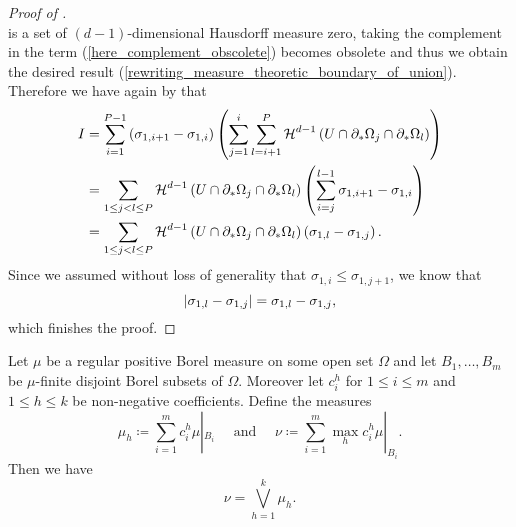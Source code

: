 \begin{proof}[Proof of ]
\begin{equation*}
	\end{equation*}
	is a set of $ (d- 1 )$-dimensional Hausdorff measure zero, taking the complement in the term (\ref{here_complement_obscolete}) becomes obsolete and thus we obtain the desired result (\ref{rewriting_measure_theoretic_boundary_of_union}).
	Therefore we have again by   that
	\begin{align*}
		I &=
		\sum_{ i = 1 }^{ P - 1 }
		\left(
		\sigma_{ 1 , i + 1 } - \sigma_{ 1 , i }
		\right)
		\left(
		\sum_{ j = 1 }^{ i }
		\sum_{ l = i + 1 }^{ P }
		\operatorname{\mathcal{H}}^{ d - 1 } \left( 
		U 
		\cap 
		\partial_{ \ast } \Omega_{ j } 
		\cap 
		\partial_{ \ast } \Omega_{ l }
		\right)
		\right)
		\\
		& =
		\sum_{ 1 \leq j < l \leq P }
		\operatorname{\mathcal{H}}^{ d - 1 } \left(
		U \cap \partial_{ \ast } \Omega_{ j }
		\cap
		\partial_{ \ast } \Omega_{ l }
		\right)
		\left(
		\sum_{ i = j }^{ l - 1 }
		\sigma_{ 1 , i + 1 } - \sigma_{ 1 , i }
		\right)
		\\
		& =
		\sum_{ 1 \leq j < l \leq P }
		\operatorname{\mathcal{H}}^{ d - 1 } \left(
		U \cap 
		\partial_{ \ast } \Omega_{ j }
		\cap
		\partial_{ \ast } \Omega_{ l }
		\right)
		\left(
		\sigma_{ 1, l } - \sigma_{ 1 , j }
		\right).
	\end{align*}
	Since we assumed without loss of generality that $ \sigma_{ 1 , i } \leq \sigma_{ 1, j + 1 } $, we know that
	\begin{equation*}
		\abs{ \sigma_{ 1 , l } - \sigma_{ 1 , j } }
		=
		\sigma_{ 1 , l } - \sigma_{ 1 , j },
	\end{equation*}
	which finishes the proof.
\end{proof}

\begin{lemma}
	\label{supremum_of_measures_lemma}
	Let $ \mu $ be a regular positive Borel measure on some open set $ \Omega $ and let $ B_{ 1 }, \dotsc, B_{ m } $ be $ \mu $-finite disjoint Borel subsets of $ \Omega $. Moreover let $ c_{ i }^{ h } $ for $ 1 \leq i \leq m $ and $ 1 \leq h \leq k $ be non-negative coefficients. Define the measures
	\begin{equation*}
		\mu_{ h } 
		\coloneqq
		\sum_{ i = 1 }^{ m }
		c_{ i }^{ h }
		\mu |_{ B_{ i } }
		\quad
		\text{ and }
		\quad 
		\nu 
		\coloneqq
		\sum_{ i = 1 }^{ m }
		\max_{ h } c_{ i }^{ h }
		\mu |_{ B_{ i } }.
	\end{equation*}
	Then we have
	\begin{equation*}
		\nu 
		=
		\bigvee_{ h = 1 }^{ k }
		\mu_{ h }.
	\end{equation*}
\end{lemma}

